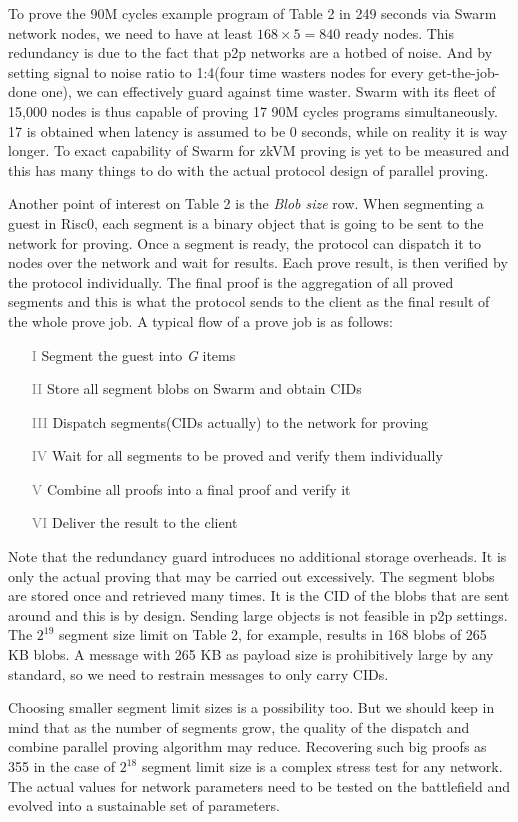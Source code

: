 \documentclass[a4paper, 10pt]{article}
\begin{document}
\par
To prove the 90M cycles example program of Table 2 in 249 seconds via Swarm network nodes, we need to have at least $168 \times 5 = 840$ ready nodes. This redundancy is due to the fact that p2p networks are a hotbed of noise. And by setting signal to noise ratio to 1:4(four time wasters nodes for every get-the-job-done one), we can effectively guard against time waster. Swarm with its fleet of 15,000 nodes is thus capable of proving 17 90M cycles programs simultaneously. 17 is obtained when latency is assumed to be 0 seconds, while on reality it is way longer. To exact capability of Swarm for zkVM proving is yet to be measured and this has many things to do with the actual protocol design of parallel proving.
\par
Another point of interest on Table 2 is the \textit{Blob size} row. When segmenting a guest in Risc0, each segment is a binary object that is going to be sent to the network for proving. Once a segment is ready, the protocol can dispatch it to nodes over the network and wait for results. Each prove result, is then verified by the protocol individually. The final proof is the aggregation of all proved segments and this is what the protocol sends to the client as the final result of the whole prove job. A typical flow of a prove job is as follows:
\begin{itemize}
    \item[\textcolor{gray}{I}] Segment the guest into \textit{G} items
    \item[\textcolor{gray}{II}] Store all segment blobs on Swarm and obtain CIDs
    \item[\textcolor{gray}{III}] Dispatch segments(CIDs actually) to the network for proving
    \item[\textcolor{gray}{IV}] Wait for all segments to be proved and verify them individually
    \item[\textcolor{gray}{V}] Combine all proofs into a final proof and verify it
    \item[\textcolor{gray}{VI}] Deliver the result to the client
\end{itemize}
Note that the redundancy guard introduces no additional storage overheads. It is only the actual proving that may be carried out excessively. The segment blobs are stored once and retrieved many times. It is the CID of the blobs that are sent around and this is by design. Sending large objects is not feasible in p2p settings. The $2^{19}$ segment size limit on Table 2, for example, results in 168 blobs of 265 KB blobs. A message with 265 KB as payload size is prohibitively large by any standard, so we need to restrain messages to only carry CIDs. 
\par
Choosing smaller segment limit sizes is a possibility too. But we should keep in mind that as the number of segments grow, the quality of the dispatch and combine parallel proving algorithm may reduce. Recovering such big proofs as 355 in the case of $2^{18}$ segment limit size is a complex stress test for any network. The actual values for network parameters need to be tested on the battlefield and evolved into a sustainable set of parameters.
\end{document}
